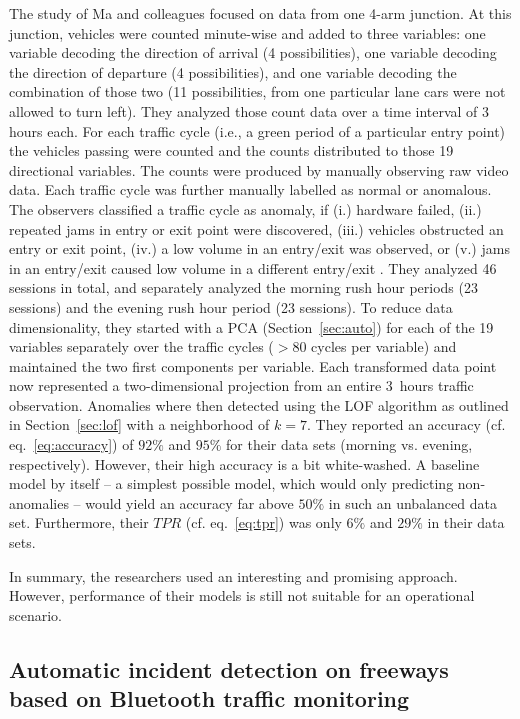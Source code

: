 \documentclass[conference]{IEEEtran}
\begin{document}
The study of Ma and colleagues focused on data from one 4-arm junction. At this junction, vehicles were counted minute-wise and added to three variables: one variable decoding the direction of arrival (4 possibilities), one variable decoding the direction of departure (4 possibilities), and one variable decoding the combination of those two (11 possibilities, from one particular lane cars were not allowed to turn left). They analyzed those count data over a time interval of 3 hours each. For each traffic cycle (i.e., a green period of a particular entry point) the vehicles passing were counted and the counts distributed to those 19 directional variables. The counts were produced by manually observing raw video data. Each traffic cycle was further manually labelled as normal or anomalous. The observers classified a traffic cycle as anomaly, if (i.) hardware failed, (ii.) repeated jams in entry or exit point were discovered, (iii.) vehicles obstructed an entry or exit point, (iv.) a low volume in an entry/exit was observed, or (v.) jams in an entry/exit caused low volume in a different entry/exit \cite{ngan2015outlier}. They analyzed 46 sessions in total, and separately analyzed the morning rush hour periods (23 sessions) and the evening rush hour period (23 sessions). To reduce data dimensionality, they started with a PCA (Section~\ref{sec:auto}) for each of the 19 variables separately over the traffic cycles ($>80$ cycles per variable) and maintained the two first components per variable. Each transformed data point now represented a two-dimensional projection from an entire 3~hours traffic observation. Anomalies where then detected using the LOF algorithm as outlined in Section~\ref{sec:lof} with a neighborhood of $k=7$. They reported an accuracy (cf. eq.~\ref{eq:accuracy}) of $92\%$ and $95\%$ for their data sets (morning vs. evening, respectively). However, their high accuracy is a bit white-washed. A baseline model by itself -- a simplest possible model, which would only predicting non-anomalies -- would yield an accuracy far above $50\%$ in such an unbalanced data set. Furthermore, their $TPR$ (cf. eq.~\ref{eq:tpr}) was only $6\%$ and $29\%$ in their data sets.
 
In summary, the researchers used an interesting and promising approach. However, performance of their models is still not suitable for an operational scenario.


\subsection{Automatic incident detection on freeways based on Bluetooth traffic monitoring \cite{mercader2020automatic}}
\label{sec:ex2}
\end{document}
